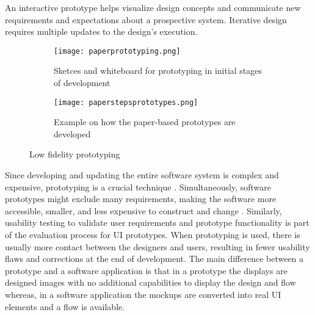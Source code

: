 An interactive prototype helps visualize design concepts and communicate new requirements and expectations about a prospective system.
Iterative design requires multiple updates to the design's execution.
\begin{figure}[htbp!]
  \centering
  \begin{subfigure}[b]{0.6\textwidth}
    \texttt{[image: paperprototyping.png]}
    \caption{Sketces and whiteboard for prototyping in initial stages of development}
    \label{fig:background:paperPrototyping}   
  \end{subfigure}             
  \begin{subfigure}[b]{0.5\textwidth}
    \texttt{[image: paperstepsprototypes.png]}
    \caption[Paper based prototypes]{Example on how the paper-based prototypes are developed  \cite{misc:prototyping:uxpin}}
    \label{fig:background:paperprototypes}
  \end{subfigure}             
  \caption[Low fidelity prototyping]{Low fidelity prototyping}
  \label{fig:background:main}
\end{figure}
Since developing and updating the entire software system is complex and expensive, prototyping is a crucial technique \cite{article:prototyping:szekely}.
Simultaneously, software prototypes might exclude many requirements, making the software more accessible, smaller, and less expensive to construct and change \cite{article:prototyping:szekely}. 
Similarly, usability testing to validate user requirements and prototype functionality is part of the evaluation process for UI prototypes.
When prototyping is used, there is usually more contact between the designers and users, resulting in fewer usability flaws and corrections at the end of development.
The main difference between a prototype and a software application is that in a prototype the displays are designed images with no additional capabilities to display the design and flow whereas, in a software application the mockups are converted into real UI elements and a flow is available.

